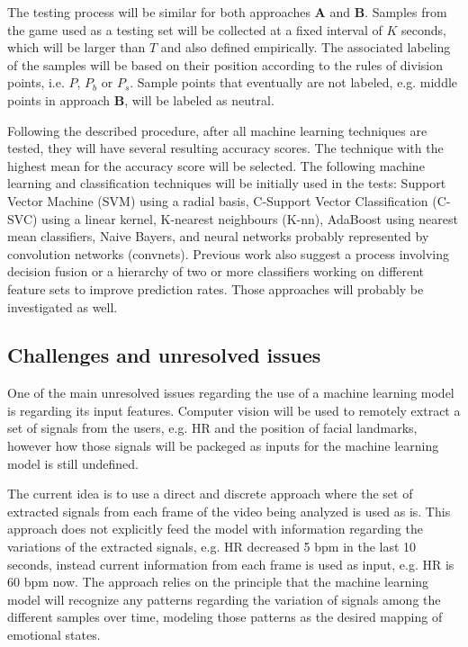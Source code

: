 The testing process will be similar for both approaches \textbf{A} and \textbf{B}. Samples from the game used as a testing set will be collected at a fixed interval of $K$ seconds, which will be larger than $T$ and also defined empirically. The associated labeling of the samples will be based on their position according to the rules of division points, i.e. $P$, $P_b$ or $P_s$. Sample points that eventually are not labeled, e.g. middle points in approach \textbf{B}, will be labeled as neutral.

Following the described procedure, after all machine learning techniques are tested, they will have several resulting accuracy scores. The technique with the highest mean for the accuracy score will be selected. The following machine learning and classification techniques will be initially used in the tests: Support Vector Machine (SVM) using a radial basis, C-Support Vector Classification (C-SVC) using a linear kernel, K-nearest neighbours (K-nn), AdaBoost using nearest mean classifiers, Naive Bayers, and neural networks probably represented by convolution networks (convnets). Previous work \parencite{samara2016sensing,akakin2010spatiotemporal} also suggest a process involving decision fusion or a hierarchy of two or more classifiers working on different feature sets to improve prediction rates. Those approaches will probably be investigated as well.

\subsection{Challenges and unresolved issues}

One of the main unresolved issues regarding the use of a machine learning model is regarding its input features. Computer vision will be used to remotely extract a set of signals from the users, e.g. HR and the position of facial landmarks, however how those signals will be packeged as inputs for the machine learning model is still undefined.

The current idea is to use a direct and discrete approach where the set of extracted signals from each frame of the video being analyzed is used as is. This approach does not explicitly feed the model with information regarding the variations of the extracted signals, e.g. HR decreased 5 bpm in the last 10 seconds, instead current information from each frame is used as input, e.g. HR is 60 bpm now. The approach relies on the principle that the machine learning model will recognize any patterns regarding the variation of signals among the different samples over time, modeling those patterns as the desired mapping of emotional states.

